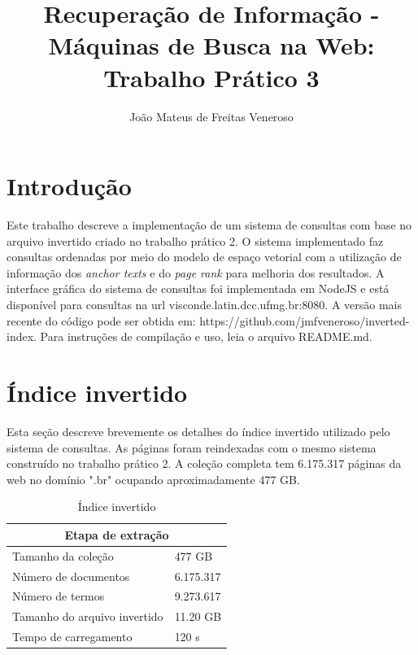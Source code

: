 \documentclass{article}
\begin{document}
\title{Recuperação de Informação - Máquinas de Busca na Web: Trabalho Prático 3}
\author{João Mateus de Freitas Veneroso}

\maketitle

\section{Introdução}

Este trabalho descreve a implementação de um sistema de consultas com base no arquivo
invertido criado no trabalho prático 2. O sistema implementado faz 
consultas ordenadas por meio do modelo de espaço vetorial com a utilização de informação dos
\textit{anchor texts} e do \textit{page rank} para melhoria dos resultados. A interface gráfica do sistema
de consultas foi implementada em NodeJS e está disponível para consultas na
url visconde.latin.dcc.ufmg.br:8080. A versão mais recente do código pode ser obtida
em: https://github.com/jmfveneroso/inverted-index. Para instruções de compilação e uso, leia
o arquivo README.md.

\section{Índice invertido}

Esta seção descreve brevemente os detalhes do índice invertido utilizado pelo sistema
de consultas. As páginas foram reindexadas com o mesmo sistema construído no trabalho
prático 2. A coleção completa tem 6.175.317 páginas da web no domínio ".br" ocupando
aproximadamente 477 GB. 

\begin{table}
\centering
\begin{tabular}{ |l|l| }
  \hline
  \multicolumn{2}{|c|}{Etapa de extração} \\
  \hline
  Tamanho da coleção & 477 GB \\
  Número de documentos & 6.175.317 \\
  Número de termos & 9.273.617 \\
  Tamanho do arquivo invertido & 11.20 GB \\
  Tempo de carregamento & 120 s \\
  \hline
\end{tabular}
\caption{Índice invertido}
\label{tab:inverted_index}
\end{table}
\end{document}
